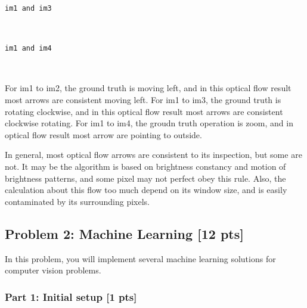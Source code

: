 \documentclass[11pt]{article}
\begin{document}
    \begin{Verbatim}[commandchars=\\\{\}]
im1 and im3

    \end{Verbatim}

    \begin{center}
    \end{center}
    { \hspace*{\fill} \\}
    
    \begin{Verbatim}[commandchars=\\\{\}]
im1 and im4

    \end{Verbatim}

    \begin{center}
    \end{center}
    { \hspace*{\fill} \\}
    
    For im1 to im2, the ground truth is moving left, and in this optical
flow result most arrows are consistent moving left. For im1 to im3, the
ground truth is rotating clockwise, and in this optical flow result most
arrows are consistent clockwise rotating. For im1 to im4, the groudn
truth operation is zoom, and in optical flow result most arrow are
pointing to outside.

In general, most optical flow arrows are consistent to its inspection,
but some are not. It may be the algorithm is based on brightness
constancy and motion of brightness patterns, and some pixel may not
perfect obey this rule. Also, the calculation about this flow too much
depend on its window size, and is easily contaminated by its surrounding
pixels.

    \hypertarget{problem-2-machine-learning-12-pts}{%
\subsection{Problem 2: Machine Learning {[}12
pts{]}}\label{problem-2-machine-learning-12-pts}}

In this problem, you will implement several machine learning solutions
for computer vision problems.

    \hypertarget{part-1-initial-setup-1-pts}{%
\subsubsection{Part 1: Initial setup {[}1
pts{]}}\label{part-1-initial-setup-1-pts}}
\end{document}
